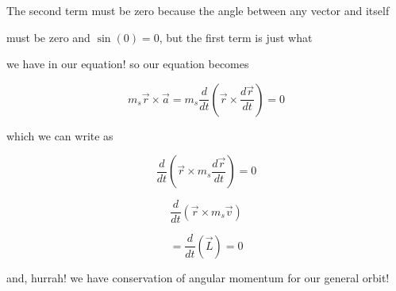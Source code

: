 The second term must be zero because the angle between any vector and itself

must be zero and $\sin \left( 0\right) =0$, but the first term is just what

we have in our equation! so our equation becomes%

$$m_{s}\overrightarrow{r}\times \overrightarrow{a}=m_{s}\frac{d}{dt}\left( \overrightarrow{r}\times \frac{d\overrightarrow{r}}{dt}\right) =0$$

which we can write as%

$$\frac{d}{dt}\left( \overrightarrow{r}\times m_{s}\frac{d\overrightarrow{r}}{dt}\right) =0$$

$$\frac{d}{dt}\left( \overrightarrow{r}\times m_{s}\overrightarrow{v}\right) $$



$$=\frac{d}{dt}\left( \overrightarrow{L}\right) =0$$

and, hurrah! we have conservation of angular momentum for our general orbit!


